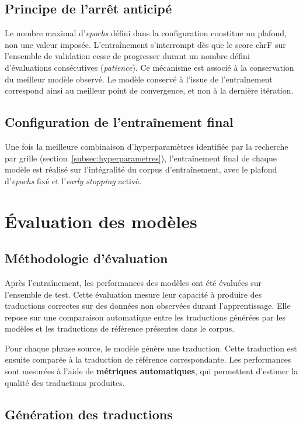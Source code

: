 \subsection{Principe de l'arrêt anticipé}
Le nombre maximal d'\textit{epochs} défini dans la configuration constitue un plafond, non une valeur imposée. L'entraînement s'interrompt dès que le score \ac{chrF} sur l'ensemble de validation cesse de progresser durant un nombre défini d'évaluations consécutives (\textit{patience}). Ce mécanisme est associé à la conservation du meilleur modèle observé. Le modèle conservé à l'issue de l'entraînement correspond ainsi au meilleur point de convergence, et non à la dernière itération.

\subsection{Configuration de l'entraînement final}
Une fois la meilleure combinaison d'hyperparamètres identifiée par la recherche par grille (section~\ref{subsec:hyperparametres}), l'entraînement final de chaque modèle est réalisé sur l'intégralité du corpus d'entraînement, avec le plafond d'\textit{epochs} fixé et l'\textit{early stopping} activé.

\section{Évaluation des modèles}
\label{sec:evaluation_modeles}

\subsection{Méthodologie d'évaluation}
\label{subsec:methodologie_evaluation}

Après l'entraînement, les performances des modèles ont été évaluées sur l'ensemble de test. Cette évaluation mesure leur capacité à produire des traductions correctes sur des données non observées durant l'apprentissage. Elle repose sur une comparaison automatique entre les traductions générées par les modèles et les traductions de référence présentes dans le corpus.

Pour chaque phrase source, le modèle génère une traduction. Cette traduction est ensuite comparée à la traduction de référence correspondante. Les performances sont mesurées à l'aide de \textbf{métriques automatiques}, qui permettent d'estimer la qualité des traductions produites.

\subsection{Génération des traductions}
\label{subsec:generation_traductions}

